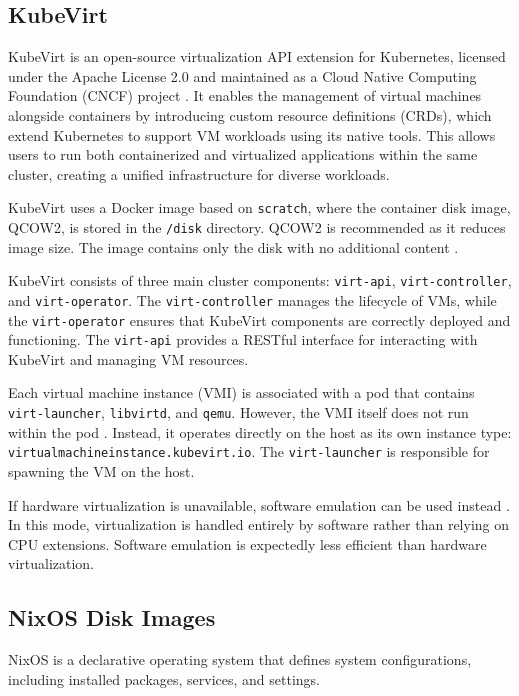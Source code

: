 \subsection{KubeVirt}
KubeVirt is an open-source virtualization API extension for Kubernetes, licensed under the Apache License 2.0 \cite{kubevirt_license} and maintained as a Cloud Native Computing Foundation (CNCF) project \parencite{kubevirt_cncf}. It enables the management of virtual machines alongside containers by introducing custom resource definitions (CRDs), which extend Kubernetes to support VM workloads using its native tools. This allows users to run both containerized and virtualized applications within the same cluster, creating a unified infrastructure for diverse workloads.

KubeVirt uses a Docker image based on \texttt{scratch}, where the container disk image, QCOW2, is stored in the \texttt{/disk} directory. QCOW2 is recommended as it reduces image size. The image contains only the disk with no additional content \cite{kubevirt_disks_volumes}.

KubeVirt consists of three main cluster components: \texttt{virt-api}, \texttt{virt-\allowbreak controller}, and \texttt{virt-operator}. The \texttt{virt-controller} manages the lifecycle of VMs, while the \texttt{virt-operator} ensures that KubeVirt components are correctly deployed and functioning. The \texttt{virt-api} provides a RESTful interface for interacting with KubeVirt and managing VM resources.

Each virtual machine instance (VMI) is associated with a pod that contains \texttt{virt-launcher}, \texttt{libvirtd}, and \texttt{qemu}. However, the VMI itself does not run within the pod \cite{kubevirt_architecture}. Instead, it operates directly on the host as its own instance type: \texttt{virtualmachineinstance.kubevirt.io}. The \texttt{virt-\allowbreak launcher} is responsible for spawning the VM on the host.

If hardware virtualization is unavailable, software emulation can be used instead \cite{kubevirt_installation}. In this mode, virtualization is handled entirely by software rather than relying on CPU extensions. Software emulation is expectedly less efficient than hardware virtualization.

\subsection{NixOS Disk Images}
NixOS is a declarative operating system that defines system configurations, including installed packages, services, and settings.

